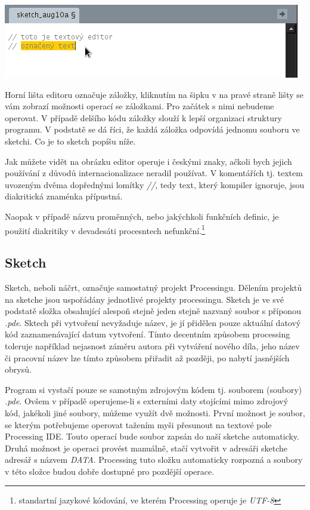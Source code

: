 \documentclass[11pt]{article}
\begin{document}
\begin{center}
\includegraphics[scale = 0.75]{imgs/editor.png}
\end{center}

Horní lišta editoru označuje záložky, kliknutím na šipku v na pravé straně lišty se vám zobrazí možnosti operací se záložkami. Pro začátek s nimi nebudeme operovat. V případě delšího kódu záložky slouží k lepší organizaci struktury programu. V podstatě se dá říci, že každá záložka odpovídá jednomu souboru ve sketchi. Co je to sketch popíšu níže.

Jak můžete vidět na obrázku editor operuje i českými znaky, ačkoli bych jejich používání z důvodů internacionalizace neradil používat. V komentářích tj. textem uvozeným dvěma dopřednými lomítky {\em //}, tedy text, který kompiler ignoruje, jsou diakritická znaménka přípustná.

Naopak v případě názvu proměnných, nebo jakýchkoli funkčních definic, je použití diakritiky v devadesáti procesntech nefunkční.\footnote{standartní jazykové kódování, ve kterém Processing operuje je {\em UTF-8}}

\subsection{Sketch}

Sketch, neboli náčrt, označuje samostatný projekt Processingu. Dělením projektů na sketche jsou uspořádány jednotlivé projekty processingu. Sketch je ve své podstatě složka obsahující alespoň stejně jeden stejně nazvaný soubor s příponou {\em *.pde}. Sktech při vytvoření nevyžaduje název, je jí přidělen pouze aktuální datový kód zaznamenávající datum vytvoření. Tímto decentním způsobem processing toleruje například nejasnost záměru autora při vytváření nového díla, jeho název či pracovní název lze tímto způsobem přiřadit až později, po nabytí jasnějších obrysů.

Program si vystačí pouze se samotným zdrojovým kódem tj. souborem (soubory) {\em *.pde}. Ovšem v případě operujeme-li s externími daty stojícími mimo zdrojový kód, jakékoli jiné soubory, můžeme využít dvě možnosti. První možnost je soubor, se kterým potřebujeme operovat tažením myši přesunout na textové pole Processing IDE. Touto operací bude soubor zapsán do naší sketche automaticky. Druhá možnost je operaci provést manuálně, stačí vytvořit v adresáři sketche adresář s názvem {\em DATA}. Processing tuto složku automaticky rozpozná a soubory v této složce budou dobře dostupné pro pozdější operace.
\end{document}
